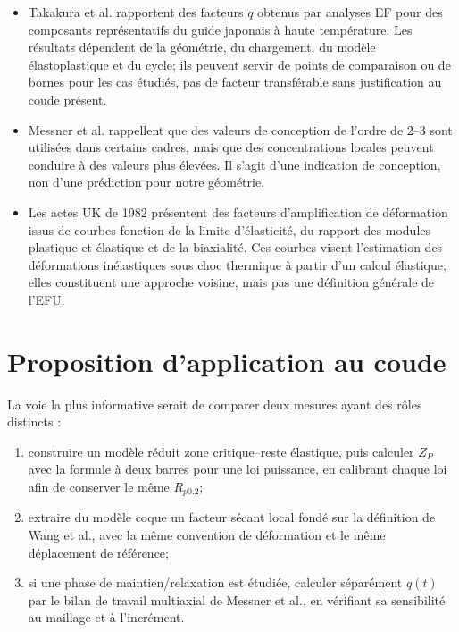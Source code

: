 \documentclass[11pt,a4paper]{article}
\begin{document}
\begin{itemize}[leftmargin=1.5em]
\item Takakura et al. rapportent des facteurs \(q\) obtenus par analyses EF
  pour des composants représentatifs du guide japonais à haute température.
  Les résultats dépendent de la géométrie, du chargement, du modèle
  élastoplastique et du cycle; ils peuvent servir de points de comparaison ou
  de bornes pour les cas étudiés, pas de facteur transférable sans justification
  au coude présent.
\item Messner et al. rappellent que des valeurs de conception de l'ordre de
  \(2\)--\(3\) sont utilisées dans certains cadres, mais que des concentrations
  locales peuvent conduire à des valeurs plus élevées. Il s'agit d'une
  indication de conception, non d'une prédiction pour notre géométrie.
\item Les actes UK de 1982 présentent des facteurs d'amplification de
  déformation issus de courbes fonction de la limite d'élasticité, du rapport
  des modules plastique et élastique et de la biaxialité. Ces courbes visent
  l'estimation des déformations inélastiques sous choc thermique à partir d'un
  calcul élastique; elles constituent une approche voisine, mais pas une
  définition générale de l'EFU.
\end{itemize}

\section{Proposition d'application au coude}

La voie la plus informative serait de comparer deux mesures ayant des rôles
distincts :
\begin{enumerate}[leftmargin=1.7em]
\item construire un modèle réduit zone critique--reste élastique, puis calculer
  \(Z_P\) avec la formule à deux barres pour une loi puissance, en calibrant
  chaque loi afin de conserver le même \(R_{p0.2}\);
\item extraire du modèle coque un facteur sécant local fondé sur la définition
  de Wang et al., avec la même convention de déformation et le même déplacement
  de référence;
\item si une phase de maintien/relaxation est étudiée, calculer séparément
  \(q(t)\) par le bilan de travail multiaxial de Messner et al., en vérifiant
  sa sensibilité au maillage et à l'incrément.
\end{enumerate}
\end{document}
